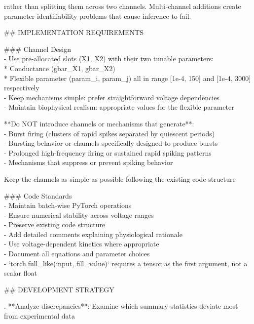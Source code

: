 \begin{tcolorbox}
     rather than splitting them across two channels. Multi-channel additions create\\{}
     parameter identifiability problems that cause inference to fail.
\par\smallskip
\#\# IMPLEMENTATION REQUIREMENTS
\par\smallskip
\#\#\# Channel Design\\{}
- Use pre-allocated slots (X1, X2) with their two tunable parameters:\\{}
  * Conductance (gbar\_X1, gbar\_X2)\\{}
  * Flexible parameter (param\_i, param\_j) all in range [1e-4, 150] and [1e-4, 3000] respectively\\{}
- Keep mechanisms simple: prefer straightforward voltage dependencies\\{}
- Maintain biophysical realism: appropriate values for the flexible parameter
\par\smallskip
**Do NOT introduce channels or mechanisms that generate**:\\{}
- Burst firing (clusters of rapid spikes separated by quiescent periods)\\{}
- Bursting behavior or channels specifically designed to produce bursts\\{}
- Prolonged high-frequency firing or sustained rapid spiking patterns\\{}
- Mechanisms that suppress or prevent spiking behavior
\par\smallskip
Keep the channels as simple as possible following the existing code structure
\par\smallskip
\#\#\# Code Standards\\{}
- Maintain batch-wise PyTorch operations\\{}
- Ensure numerical stability across voltage ranges\\{}
- Preserve existing code structure\\{}
- Add detailed comments explaining physiological rationale\\{}
- Use voltage-dependent kinetics where appropriate\\{}
- Document all equations and parameter choices\\{}
- `torch.full\_like(input, fill\_value)` requires a tensor as the first argument, not a scalar float
\par\smallskip
\#\# DEVELOPMENT STRATEGY
\par{}. **Analyze discrepancies**: Examine which summary statistics deviate most from experimental data\\{}

\end{tcolorbox}
